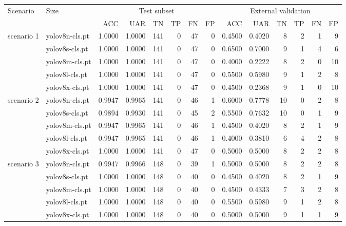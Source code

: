 \begin{table*}
    \centering
    \begin{tabular}{llrrrrrrrrrrrr}
        \toprule
         \multirow{2}{*}{Scenario} & \multirow{2}{*}{Size} & \multicolumn{6}{c}{Test subset} & \multicolumn{6}{c}{External validation} \\
         & & ACC & UAR & TN & TP & FN & FP & ACC & UAR & TN & TP & FN & FP \\
        \midrule
            \multirow{5}{*}{scenario 1} & yolov8n-cls.pt & 1.0000 & 1.0000 & 141 & 0 & 47 & 0 & 0.4500 & 0.4020 & 8 & 2 & 1 & 9 \\
			 & yolov8s-cls.pt & 1.0000 & 1.0000 & 141 & 0 & 47 & 0 & 0.6500 & 0.7000 & 9 & 1 & 4 & 6 \\
			 & yolov8m-cls.pt & 1.0000 & 1.0000 & 141 & 0 & 47 & 0 & 0.4000 & 0.2222 & 8 & 2 & 0 & 10 \\
			 & yolov8l-cls.pt & 1.0000 & 1.0000 & 141 & 0 & 47 & 0 & 0.5500 & 0.5980 & 9 & 1 & 2 & 8 \\
			 & yolov8x-cls.pt & 1.0000 & 1.0000 & 141 & 0 & 47 & 0 & 0.4500 & 0.2368 & 9 & 1 & 0 & 10 \\
			\midrule
			\multirow{5}{*}{scenario 2} & yolov8n-cls.pt & 0.9947 & 0.9965 & 141 & 0 & 46 & 1 & 0.6000 & 0.7778 & 10 & 0 & 2 & 8 \\
			 & yolov8s-cls.pt & 0.9894 & 0.9930 & 141 & 0 & 45 & 2 & 0.5500 & 0.7632 & 10 & 0 & 1 & 9 \\
			 & yolov8m-cls.pt & 0.9947 & 0.9965 & 141 & 0 & 46 & 1 & 0.4500 & 0.4020 & 8 & 2 & 1 & 9 \\
			 & yolov8l-cls.pt & 0.9947 & 0.9965 & 141 & 0 & 46 & 1 & 0.4000 & 0.3810 & 6 & 4 & 2 & 8 \\
			 & yolov8x-cls.pt & 1.0000 & 1.0000 & 141 & 0 & 47 & 0 & 0.5000 & 0.5000 & 8 & 2 & 2 & 8 \\
			\midrule
			\multirow{5}{*}{scenario 3} & yolov8n-cls.pt & 0.9947 & 0.9966 & 148 & 0 & 39 & 1 & 0.5000 & 0.5000 & 8 & 2 & 2 & 8 \\
			 & yolov8s-cls.pt & 1.0000 & 1.0000 & 148 & 0 & 40 & 0 & 0.4500 & 0.4020 & 8 & 2 & 1 & 9 \\
			 & yolov8m-cls.pt & 1.0000 & 1.0000 & 148 & 0 & 40 & 0 & 0.4500 & 0.4333 & 7 & 3 & 2 & 8 \\
			 & yolov8l-cls.pt & 1.0000 & 1.0000 & 148 & 0 & 40 & 0 & 0.5500 & 0.5980 & 9 & 1 & 2 & 8 \\
			 & yolov8x-cls.pt & 1.0000 & 1.0000 & 148 & 0 & 40 & 0 & 0.5000 & 0.5000 & 9 & 1 & 1 & 9 \\

\end{tabular}
\end{table*}
